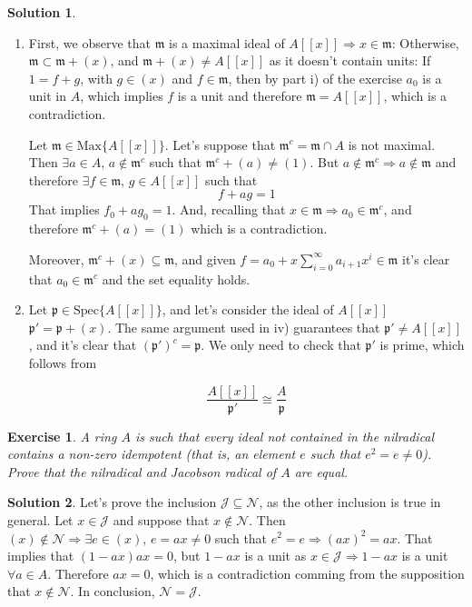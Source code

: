 \documentclass[12pt]{article}
\newcommand{\imp}{\ensuremath{\Rightarrow}}
\newtheorem{ex}{Exercise}[section]
\theoremstyle{definition}
\newtheorem*{sol}{Solution}
\begin{document}
\begin{sol}
\begin{enumerate}[label=(\roman*)]
		\item First, we observe that $\mathfrak{m}$ is a maximal ideal of $A[[x]] \imp x \in \mathfrak{m}$: Otherwise, $\mathfrak{m} \subset \mathfrak{m} + (x)$, and $\mathfrak{m} + (x) \neq A[[x]]$ as it doesn't contain units: If $1 = f + g$, with $g \in (x)$ and $f \in \mathfrak{m}$, then by part i) of the exercise $a_0$ is a unit in $A$, which implies $f$ is a unit and therefore $\mathfrak{m} = A[[x]]$, which is a contradiction.

		Let $\mathfrak{m} \in \text{Max}\{A[[x]]\}$. Let's suppose that $\mathfrak{m}^c = \mathfrak{m} \cap A$ is not maximal. Then $\exists a \in A, \, a \notin \mathfrak{m}^c$ such that $\mathfrak{m}^c + (a) \neq (1)$. But $a \notin \mathfrak{m}^c \imp a \notin \mathfrak{m}$ and therefore $\exists f \in \mathfrak{m}, \, g \in A[[x]]$ such that 
		\[
			f + ag = 1
		\]
		That implies $f_0 + ag_0 = 1$. And, recalling that $x \in \mathfrak{m} \imp a_0 \in \mathfrak{m}^c$, and therefore $\mathfrak{m}^c + (a) = (1)$ which is a contradiction.


		Moreover, $\mathfrak{m}^c + (x) \subseteq \mathfrak{m}$, and given $f = a_0 + x \sum_{i = 0}^\infty a_{i+1} x^i \in \mathfrak{m}$ it's clear that $a_0 \in \mathfrak{m}^c$ and the set equality holds.

		\item Let $\mathfrak{p} \in \text{Spec}\{A[[x]]\}$, and let's consider the ideal of $A[[x]]$ $\mathfrak{p}' = \mathfrak{p} + (x)$. The same argument used in iv) guarantees that $\mathfrak{p}' \neq A[[x]]$, and it's clear that $(\mathfrak{p}')^c = \mathfrak{p}$. We only need to check that $\mathfrak{p}'$ is prime, which follows from

		\[
			\frac{A[[x]]}{\mathfrak{p}'} \cong \frac{A}{\mathfrak{p}}
		\]
	\end{enumerate}


\end{sol}


\begin{ex}
A ring $A$ is such that every ideal not contained in the nilradical contains a non-zero idempotent (that is, an element $e$ such that $e^2 = e \neq 0$). Prove that the nilradical and Jacobson radical of $A$ are equal.
\end{ex}

\begin{sol}
 Let's prove the inclusion $\mathcal{J} \subseteq \mathcal{N}$, as the other inclusion is true in general. Let $x \in \mathcal{J}$ and suppose that $x \notin \mathcal{N}$. Then $(x) \notin \mathcal{N} \imp \exists e \in (x), \, e = ax \neq 0$ such that $e^2 = e \imp (ax)^2 = ax$. That implies that $(1-ax)ax = 0$, but $1-ax$ is a unit as $x \in \mathcal{J} \imp 1-ax$ is a unit $\forall a \in A$. Therefore $ax = 0$, which is a contradiction comming from the supposition that $x \notin \mathcal{N}$. In conclusion, $\mathcal{N} = \mathcal{J}$.
\end{sol}
\end{document}
